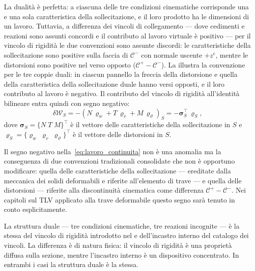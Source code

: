 La dualità è perfetta: a ciascuna delle tre
condizioni cinematiche corrisponde una e una sola
caratteristica della sollecitazione, e il loro
prodotto ha le dimensioni di un lavoro. Tuttavia,
a differenza dei vincoli di collegamento --- dove
cedimenti e reazioni sono assunti concordi e il
contributo al lavoro virtuale è positivo ---
per il vincolo di rigidità le due convenzioni
sono assunte discordi: le caratteristiche della
sollecitazione sono positive sulla faccia di
$\mathcal{C}^-$ con normale uscente $+z^e$, mentre
le distorsioni sono positive nel verso opposto
($\mathcal{C}^+ - \mathcal{C}^-$). 
La  illustra la 
convenzione per le tre coppie duali: in ciascun 
pannello la freccia della distorsione e quella 
della caratteristica della sollecitazione duale 
hanno versi opposti, e il loro contributo al 
lavoro è negativo. 
Il contributo del vincolo di rigidità all'identità 
bilineare entra quindi con segno negativo:
\begin{equation}\label{eq:lavoro_continuita}
	\delta\mathcal{W}_S =	-\left(N\,\varrho_w + T\,\varrho_v +	M\,\varrho_\vartheta\right)_S =	-\bm{\sigma}_S^{\top}\,\bm{\varrho}_S,
\end{equation}
dove $\bm{\sigma}_S = \{N\; T\; M\}^{\!\top}$ è il
vettore delle caratteristiche della sollecitazione in $S$
e $\bm{\varrho}_S = \{\varrho_w\; \varrho_v\;
\varrho_\vartheta\}^{\!\top}$ è il vettore
delle distorsioni in $S$.







\begin{oss}
	Il segno negativo nella~\eqref{eq:lavoro_continuita}
	non è una anomalia ma la conseguenza di due
	convenzioni tradizionali consolidate che non
	è opportuno modificare: quella delle
	caratteristiche della sollecitazione --- ereditate
	dalla meccanica dei solidi deformabili e riferite
	all'elemento di trave --- e quella delle
	distorsioni --- riferite alla discontinuità
	cinematica come differenza $\mathcal{C}^+ -
	\mathcal{C}^-$. Nei capitoli sul TLV applicato
	alla trave deformabile questo segno sarà
	tenuto in conto esplicitamente.
\end{oss}

\begin{oss}
	La struttura duale --- tre condizioni cinematiche,
	tre reazioni incognite --- è la stessa del
	vincolo di rigidità introdotto nel
	 e dell'incastro interno
	del catalogo dei vincoli. La differenza è di
	natura fisica: il vincolo di rigidità è una
	proprietà diffusa sulla sezione, mentre l'incastro
	interno è un dispositivo concentrato. In entrambi
	i casi la struttura duale è la stessa.
\end{oss}


